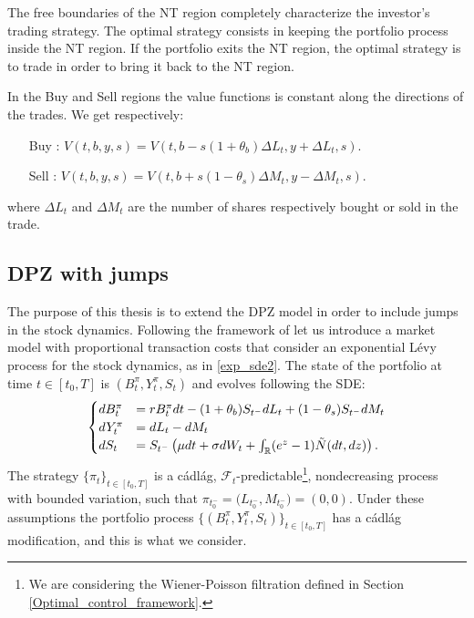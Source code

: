 The free boundaries of the NT region completely characterize the investor's trading strategy.
The optimal strategy consists in keeping the portfolio process inside the NT region. 
If the portfolio exits the NT region, the optimal strategy is to trade in order to bring it back to the NT region.

In the Buy and Sell regions the value functions is constant along the directions of the trades.
We get respectively:
\begin{itemize}
 \item[Buy]: \hspace{2em} $V(t,b,y,s) = V(t,b-s(1+\theta_b)\Delta L_t,y+\Delta L_t,s).$
 \item[Sell]: \hspace{2em} $ V(t,b,y,s) = V(t,b+s(1-\theta_s)\Delta M_t,y-\Delta M_t,s).$
\end{itemize}
where $\Delta L_t$ and $\Delta M_t$ are the number of shares respectively bought or sold in the trade.





\subsection{DPZ with jumps}\label{DPZ_j_sec}


The purpose of this thesis is to extend the DPZ model in order to include jumps in the stock dynamics. 
Following the framework of \cite{Kab16} let us introduce a market model with proportional transaction costs 
that consider an exponential Lévy process for the stock dynamics, as in \ref{exp_sde2}.
The state of the portfolio at time $t\in [t_0,T]$ is $(B^{\pi}_t,Y^{\pi}_t,S_t)$ and evolves following the SDE:
\begin{equation}\label{porfolio_dynamics}
 \begin{cases}
 dB^{\pi}_t &=  rB^{\pi}_t dt - (1+\theta_b)S_{t^-} dL_t + (1-\theta_s) S_{t^-} dM_t \\
 dY^{\pi}_t &=  dL_t - dM_t \\
 dS_t &=  S_{t^-} \left( \mu dt + \sigma dW_t + \int_{\mathbb{R}} (e^z-1) \tilde N(dt,dz) \right).
\end{cases}
\end{equation}
The strategy $\{\pi_t\}_{t \in [t_0,T]}$ is a cádlág, $\mathcal{F}_t$-predictable\footnote{We are considering the Wiener-Poisson filtration 
defined in Section \ref{Optimal_control_framework}.}, nondecreasing process with bounded variation, such that
$ \pi_{t_0^-} = \bigl ( L_{t_0^-} , M_{t_0^-} \bigr ) = (0,0)$. 
Under these assumptions the portfolio process 
$\bigl \{(B^{\pi}_t,Y^{\pi}_t,S_t)\bigr \}_{t \in [t_0,T]}$ has a cádlág modification, and this is what we consider.

